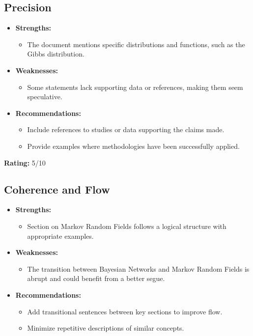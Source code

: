 \documentclass{article}
\begin{document}
\subsection{Precision}
\begin{itemize}
    \item \textbf{Strengths:}
    \begin{itemize}
        \item The document mentions specific distributions and functions, such as the Gibbs distribution.
    \end{itemize}

    \item \textbf{Weaknesses:}
    \begin{itemize}
        \item Some statements lack supporting data or references, making them seem speculative.
    \end{itemize}

    \item \textbf{Recommendations:}
    \begin{itemize}
        \item Include references to studies or data supporting the claims made.
        \item Provide examples where methodologies have been successfully applied.
    \end{itemize}
\end{itemize}

\textbf{Rating:} 5/10

\subsection{Coherence and Flow}
\begin{itemize}
    \item \textbf{Strengths:}
    \begin{itemize}
        \item Section on Markov Random Fields follows a logical structure with appropriate examples.
    \end{itemize}

    \item \textbf{Weaknesses:}
    \begin{itemize}
        \item The transition between Bayesian Networks and Markov Random Fields is abrupt and could benefit from a better segue.
    \end{itemize}

    \item \textbf{Recommendations:}
    \begin{itemize}
        \item Add transitional sentences between key sections to improve flow.
        \item Minimize repetitive descriptions of similar concepts.
    \end{itemize}
\end{itemize}
\end{document}
